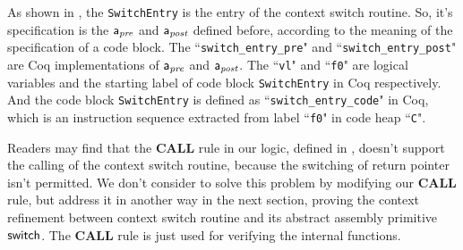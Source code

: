 As shown in \Fig{\ref{fig:The Structure of Context Switch Module}}, 
the {\texttt{SwitchEntry}} is the entry of the context switch 
routine. So, it's specification is the $\mathsf{a}_{\textit{pre}}$ and $\mathsf{a}_{\textit{post}}$ defined 
before, according to the meaning of the specification of a code block. 
The ``{\tt switch\_entry\_pre}" and ``{\tt switch\_entry\_post}" 
are Coq implementations of $\mathsf{a}_{\textit{pre}}$ and $\mathsf{a}_{\textit{post}}$. 
The ``{\tt vl}" and ``{\tt f0}" are logical variables 
and the starting label of code block {\texttt{SwitchEntry}} in Coq 
respectively. And the code block {\tt SwitchEntry} is defined as 
``{\tt switch\_entry\_code}" in Coq, which is an instruction sequence 
extracted from label ``{\tt f0}" in code heap ``{\tt C}". 

Readers may find that the \textbf{CALL} rule in our logic,
defined in \Fig{\ref{fig:Seleted Inference rules}}, doesn't 
support the calling of the context switch routine, because 
the switching of return pointer isn't permitted. We don't 
consider to solve this problem by modifying our \textbf{CALL} 
rule, but address it in another way in the next section, 
proving the context refinement between context switch routine 
and its abstract assembly primitive $\mathsf{switch}$. The \textbf{CALL} 
rule is just used for verifying the internal functions. 

